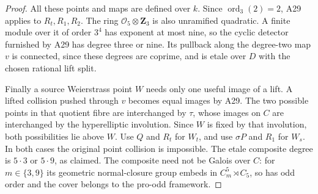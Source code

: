 \begin{proof}
All these points and maps are defined over $k$. Since
$\operatorname{ord}_3(2)=2$, A29 applies to $R_t,R_1,R_2$.
The ring $\mathcal O_5\otimes\mathbf Z_3$ is also unramified
quadratic. A finite module over it of order $3^4$ has exponent
at most nine, so the cyclic detector furnished by A29 has
degree three or nine. Its pullback along the degree-two map
$v$ is connected, since these degrees are coprime, and is
etale over $D$ with the chosen rational lift split.

Finally a source Weierstrass point $W$ needs only one useful
image of a lift. A lifted collision pushed through $v$
becomes equal images by A29. The two possible points in that
quotient fibre are interchanged by $\tau$, whose images on
$C$ are interchanged by the hyperelliptic involution. Since
$W$ is fixed by that involution, both possibilities lie above
$W$. Use $Q$ and $R_t$ for $W_t$, and use $\sigma P$ and
$R_1$ for $W_s$. In both cases the original point collision
is impossible. The etale composite degree is $5\cdot3$ or
$5\cdot9$, as claimed. The composite need not be Galois
over $C$: for $m\in\{3,9\}$ its geometric normal-closure
group embeds in $C_m^5\rtimes C_5$, so has odd order and
the cover belongs to the pro-odd framework.
\end{proof}
